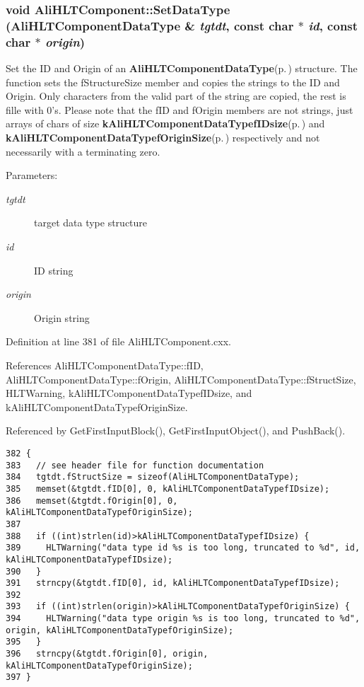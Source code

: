 \subsubsection{\setlength{\rightskip}{0pt plus 5cm}void Ali\-HLTComponent::Set\-Data\-Type ({\bf Ali\-HLTComponent\-Data\-Type} \& {\em tgtdt}, const char $\ast$ {\em id}, const char $\ast$ {\em origin})\hspace{0.3cm}{\tt  [protected]}}\label{classAliHLTComponent_b4}


Set the ID and Origin of an {\bf Ali\-HLTComponent\-Data\-Type}{\rm (p.\,\pageref{structAliHLTComponentDataType})} structure. The function sets the f\-Structure\-Size member and copies the strings to the ID and Origin. Only characters from the valid part of the string are copied, the rest is fille with 0's. Please note that the f\-ID and f\-Origin members are not strings, just arrays of chars of size {\bf k\-Ali\-HLTComponent\-Data\-Typef\-IDsize}{\rm (p.\,\pageref{AliHLTDataTypes_8h_a12})} and {\bf k\-Ali\-HLTComponent\-Data\-Typef\-Origin\-Size}{\rm (p.\,\pageref{AliHLTDataTypes_8h_a13})} respectively and not necessarily with a terminating zero. \begin{Desc}
\item[Parameters:]
\begin{description}
\item[{\em tgtdt}]target data type structure \item[{\em id}]ID string \item[{\em origin}]Origin string \end{description}
\end{Desc}


Definition at line 381 of file Ali\-HLTComponent.cxx.

References Ali\-HLTComponent\-Data\-Type::f\-ID, Ali\-HLTComponent\-Data\-Type::f\-Origin, Ali\-HLTComponent\-Data\-Type::f\-Struct\-Size, HLTWarning, k\-Ali\-HLTComponent\-Data\-Typef\-IDsize, and k\-Ali\-HLTComponent\-Data\-Typef\-Origin\-Size.

Referenced by Get\-First\-Input\-Block(), Get\-First\-Input\-Object(), and Push\-Back().

\footnotesize\begin{verbatim}382 {
383   // see header file for function documentation
384   tgtdt.fStructSize = sizeof(AliHLTComponentDataType);
385   memset(&tgtdt.fID[0], 0, kAliHLTComponentDataTypefIDsize);
386   memset(&tgtdt.fOrigin[0], 0, kAliHLTComponentDataTypefOriginSize);
387 
388   if ((int)strlen(id)>kAliHLTComponentDataTypefIDsize) {
389     HLTWarning("data type id %s is too long, truncated to %d", id, kAliHLTComponentDataTypefIDsize);
390   }
391   strncpy(&tgtdt.fID[0], id, kAliHLTComponentDataTypefIDsize);
392 
393   if ((int)strlen(origin)>kAliHLTComponentDataTypefOriginSize) {
394     HLTWarning("data type origin %s is too long, truncated to %d", origin, kAliHLTComponentDataTypefOriginSize);
395   }
396   strncpy(&tgtdt.fOrigin[0], origin, kAliHLTComponentDataTypefOriginSize);
397 }
\end{verbatim}\normalsize 


